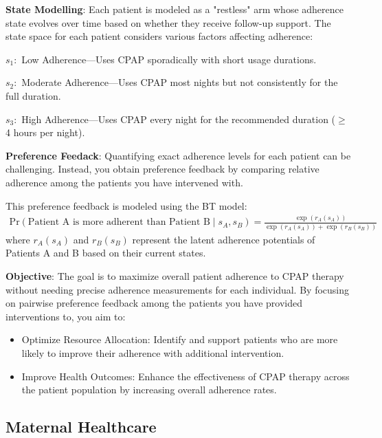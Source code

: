 \documentclass{article} %
\begin{document}
{\textbf{State Modelling}: Each patient is modeled as a "restless" arm whose adherence state evolves over time based on whether they receive follow-up support. The state space for each patient considers various factors affecting adherence:

$
s_1:$ Low Adherence—Uses CPAP sporadically with short usage durations.

$
s_2:$ Moderate Adherence—Uses CPAP most nights but not consistently for the full duration.

$
s_3:$ High Adherence—Uses CPAP every night for the recommended duration ($\geq$ 4 hours per night).



\textbf{Preference Feedack}: Quantifying exact adherence levels for each patient can be challenging. Instead, you obtain preference feedback by comparing relative adherence among the patients you have intervened with. 

This preference feedback is modeled using the BT model:
\begin{align*}
   \text{Pr}(\text{Patient A is more adherent than Patient B} \mid s_A, s_B) = \frac{\exp(r_A(s_A))}{\exp(r_A(s_A)) + \exp(r_B(s_B))}
\end{align*}
where $r_A(s_A)$ and $r_B(s_B)$ represent the latent adherence potentials of Patients A and B based on their current states.



\textbf{Objective}: The goal is to maximize overall patient adherence to CPAP therapy without needing precise adherence measurements for each individual. By focusing on pairwise preference feedback among the patients you have provided interventions to, you aim to:
\begin{itemize}
    \item Optimize Resource Allocation: Identify and support patients who are more likely to improve their adherence with additional intervention.
    \item Improve Health Outcomes: Enhance the effectiveness of CPAP therapy across the patient population by increasing overall adherence rates.
\end{itemize}







\subsection{Maternal Healthcare} \label{sec:Armman_description}

}
\end{document}
